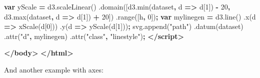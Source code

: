 \documentclass[openany]{book}
\newenvironment{Shaded}{\begin{snugshade}}{\end{snugshade}}
\newcommand{\AttributeTok}[1]{\textcolor[rgb]{0.77,0.63,0.00}{#1}}
\newcommand{\DecValTok}[1]{\textcolor[rgb]{0.00,0.00,0.81}{#1}}
\newcommand{\KeywordTok}[1]{\textcolor[rgb]{0.13,0.29,0.53}{\textbf{#1}}}
\newcommand{\NormalTok}[1]{#1}
\newcommand{\OperatorTok}[1]{\textcolor[rgb]{0.81,0.36,0.00}{\textbf{#1}}}
\newcommand{\StringTok}[1]{\textcolor[rgb]{0.31,0.60,0.02}{#1}}
\newcommand{\VariableTok}[1]{\textcolor[rgb]{0.00,0.00,0.00}{#1}}
\begin{document}
\begin{Shaded}
\begin{Highlighting}[]
      \KeywordTok{var}\NormalTok{ yScale }\OperatorTok{=} \VariableTok{d3}\NormalTok{.}\AttributeTok{scaleLinear}\NormalTok{()}
\NormalTok{        .}\AttributeTok{domain}\NormalTok{([}\VariableTok{d3}\NormalTok{.}\AttributeTok{min}\NormalTok{(dataset}\OperatorTok{,}\NormalTok{ d }\OperatorTok{=>}\NormalTok{ d[}\DecValTok{1}\NormalTok{]) }\OperatorTok{-} \DecValTok{20}\OperatorTok{,}
                 \VariableTok{d3}\NormalTok{.}\AttributeTok{max}\NormalTok{(dataset}\OperatorTok{,}\NormalTok{ d }\OperatorTok{=>}\NormalTok{ d[}\DecValTok{1}\NormalTok{]) }\OperatorTok{+} \DecValTok{20}\NormalTok{])}
\NormalTok{        .}\AttributeTok{range}\NormalTok{([h}\OperatorTok{,} \DecValTok{0}\NormalTok{])}\OperatorTok{;}
      \KeywordTok{var}\NormalTok{ mylinegen }\OperatorTok{=} \VariableTok{d3}\NormalTok{.}\AttributeTok{line}\NormalTok{()}
\NormalTok{        .}\AttributeTok{x}\NormalTok{(d }\OperatorTok{=>} \AttributeTok{xScale}\NormalTok{(d[}\DecValTok{0}\NormalTok{]))}
\NormalTok{        .}\AttributeTok{y}\NormalTok{(d }\OperatorTok{=>} \AttributeTok{yScale}\NormalTok{(d[}\DecValTok{1}\NormalTok{]))}\OperatorTok{;}
      \VariableTok{svg}\NormalTok{.}\AttributeTok{append}\NormalTok{(}\StringTok{"path"}\NormalTok{)}
\NormalTok{         .}\AttributeTok{datum}\NormalTok{(dataset)}
\NormalTok{         .}\AttributeTok{attr}\NormalTok{(}\StringTok{"d"}\OperatorTok{,}\NormalTok{ mylinegen)}
\NormalTok{         .}\AttributeTok{attr}\NormalTok{(}\StringTok{"class"}\OperatorTok{,} \StringTok{"linestyle"}\NormalTok{)}\OperatorTok{;}
    \KeywordTok{</script>}

  \KeywordTok{</body>}
\KeywordTok{</html>}
\end{Highlighting}
\end{Shaded}

And another example with axes:
\end{document}
